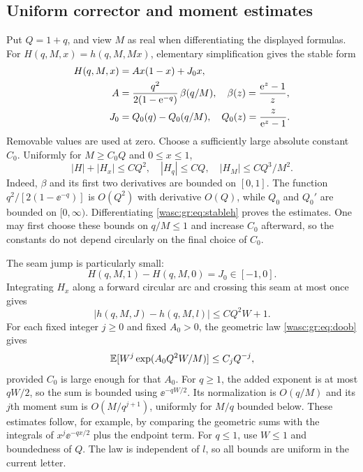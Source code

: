 \documentclass[11pt,a4paper]{article}
\theoremstyle{remark}\newtheorem{remark}[theorem]{Remark}
\numberwithin{equation}{section}
\begin{document}
\subsection{Uniform corrector and moment estimates}
Put $Q=1+q$, and view $M$ as real when differentiating the displayed formulas. For $H(q,M,x)=h(q,M,Mx)$, elementary simplification gives the stable form
\begin{align}\label{wasc:gr:eq:stableh}
H(q,M,x)&=A x(1-x)+J_0x,\notag\\
A&=\frac{q^2}{2(1-\mathrm e^{-q})}\,\beta(q/M),\quad
\beta(z)=\frac{\mathrm e^z-1}{z},\notag\\
J_0&=Q_0(q)-Q_0(q/M),\quad Q_0(z)=\frac z{\mathrm e^z-1}.
\end{align}
Removable values are used at zero. Choose a sufficiently large absolute constant $C_0$. Uniformly for $M\ge C_0Q$ and $0\le x\le1$,
\begin{equation}\label{wasc:gr:eq:hestimates}
|H|+|H_x|\le C Q^2,\quad |H_q|\le C Q,\quad
|H_M|\le C Q^3/M^2.
\end{equation}
Indeed, $\beta$ and its first two derivatives are bounded on $[0,1]$. The function $q^2/[2(1-\ee^{-q})]$ is $O(Q^2)$ with derivative $O(Q)$, while $Q_0$ and $Q_0'$ are bounded on $[0,\infty)$. Differentiating \eqref{wasc:gr:eq:stableh} proves the estimates. One may first choose these bounds on $q/M\le1$ and increase $C_0$ afterward, so the constants do not depend circularly on the final choice of $C_0$.

The seam jump is particularly small:
\begin{equation}\label{wasc:gr:eq:seam}
H(q,M,1)-H(q,M,0)=J_0\in[-1,0].
\end{equation}
Integrating $H_x$ along a forward circular arc and crossing this seam at most once gives
\begin{equation}\label{wasc:gr:eq:circularh}
|h(q,M,J)-h(q,M,l)|\le C Q^2W+1.
\end{equation}
For each fixed integer $j\ge0$ and fixed $A_0>0$, the geometric law \eqref{wasc:gr:eq:doob} gives
\begin{equation}\label{wasc:gr:eq:geometricmoments}
\mathbb E[W^j\exp(A_0Q^2W/M)]\le C_j Q^{-j},
\end{equation}
provided $C_0$ is large enough for that $A_0$. For $q\ge1$, the added exponent is at most $qW/2$, so the sum is bounded using $\ee^{-qW/2}$. Its normalization is $O(q/M)$ and its $j$th moment sum is $O(M/q^{j+1})$, uniformly for $M/q$ bounded below. These estimates follow, for example, by comparing the geometric sums with the integrals of $x^j\ee^{-qx/2}$ plus the endpoint term. For $q\le1$, use $W\le1$ and boundedness of $Q$. The law is independent of $l$, so all bounds are uniform in the current letter.
\end{document}
